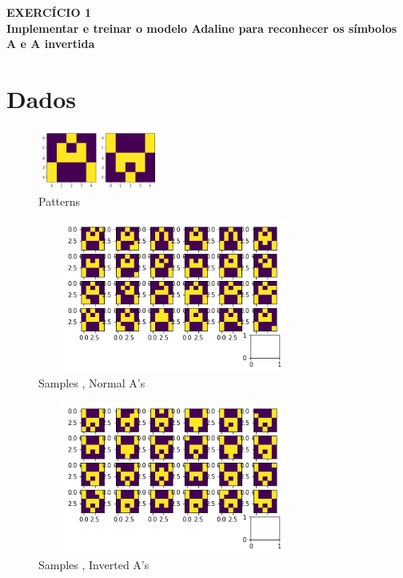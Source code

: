 \documentclass[10pt,a4paper]{report}
\begin{document}
	\begin{center}
		\textbf{{\Large EXERCÍCIO 1}
		\\
		{\normalsize Implementar e treinar o modelo Adaline para reconhecer os símbolos A e A invertida}}
	\end{center}

	\section{Dados}
	
	\begin{figure}[h]
		\centering
		\includegraphics[width=4cm, height=2cm]{patterns.png}
		\caption{Patterns}
		\label{fig:patterns}
	\end{figure}

	\begin{figure}[h]
		\centering
		\includegraphics[width=9cm, height=5cm]{a_normal.png}
		\caption{Samples , Normal A's}
		\label{fig:patterns}
	\end{figure}

	\begin{figure}[h]
		\centering
		\includegraphics[width=9cm, height=5cm]{a_inverted.png}
		\caption{Samples , Inverted A's}
		\label{fig:patterns}
	\end{figure}
	
\end{document}
